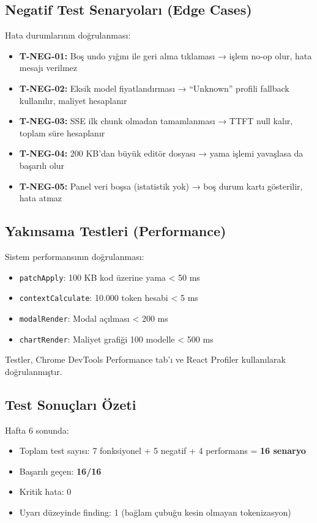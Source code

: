 \documentclass[12pt,a4paper]{article}
\begin{document}
\subsection{Negatif Test Senaryoları (Edge Cases)}

Hata durumlarının doğrulanması:

\begin{itemize}[leftmargin=*]
  \item \textbf{T-NEG-01:} Boş undo yığını ile geri alma tıklaması → işlem no-op olur, hata mesajı verilmez
  \item \textbf{T-NEG-02:} Eksik model fiyatlandırması → ``Unknown'' profili fallback kullanılır, maliyet hesaplanır
  \item \textbf{T-NEG-03:} SSE ilk chunk olmadan tamamlanması → TTFT null kalır, toplam süre hesaplanır
  \item \textbf{T-NEG-04:} 200 KB'dan büyük editör dosyası → yama işlemi yavaşlasa da başarılı olur
  \item \textbf{T-NEG-05:} Panel veri boşsa (istatistik yok) → boş durum kartı gösterilir, hata atmaz
\end{itemize}

\subsection{Yakınsama Testleri (Performance)}

Sistem performansının doğrulanması:

\begin{itemize}[leftmargin=*]
  \item \texttt{patchApply}: 100 KB kod üzerine yama < 50 ms
  \item \texttt{contextCalculate}: 10.000 token hesabi < 5 ms
  \item \texttt{modalRender}: Modal açılması < 200 ms
  \item \texttt{chartRender}: Maliyet grafiği 100 modelle < 500 ms
\end{itemize}

Testler, Chrome DevTools Performance tab'ı ve React Profiler kullanılarak doğrulanmıştır.

\subsection{Test Sonuçları Özeti}

Hafta 6 sonunda:
\begin{itemize}[leftmargin=*]
  \item Toplam test sayısı: 7 fonksiyonel + 5 negatif + 4 performans = \textbf{16 senaryo}
  \item Başarılı geçen: \textbf{16/16}
  \item Kritik hata: 0
  \item Uyarı düzeyinde finding: 1 (bağlam çubuğu kesin olmayan tokenizasyon)
\end{itemize}
\end{document}
